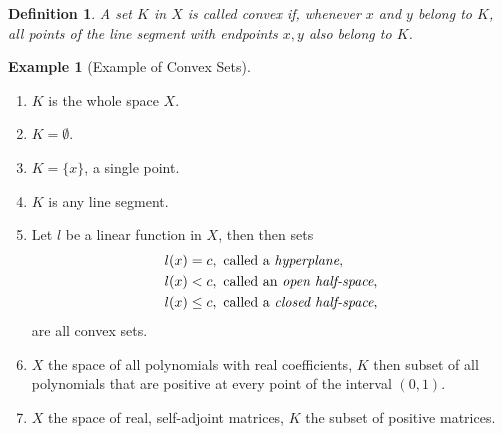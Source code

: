 \documentclass[10pt]{book}
\newtheorem{definition}{Definition}[chapter]
\theoremstyle{definition}
\newtheorem{example}{Example}[chapter]
\numberwithin{equation}{chapter}
\begin{document}
\medskip

\begin{definition}
A set $K$ in $X$ is called convex if, whenever $x$ and $y$ belong to $K$, all points of the line segment with endpoints $x, y$ also belong to $K$.
\end{definition}

\medskip

\begin{example}[Example of Convex Sets]
~\begin{enumerate}[label=(\arabic*)]
    \item $K$ is the whole space $X$.
    
    \item $K = \emptyset$.
    
    \item $K = \{x\}$, a single point.
    
    \item $K$ is any line segment.
    
    \item Let $l$ be a linear function in $X$, then then sets 
    \begin{align*}
        l(x) & = c, \,\,\text{called a {\em hyperplane}}, \\
        l(x) & < c, \,\,\text{called an {\em open half-space}}, \\
        l(x) & \leq c, \,\,\text{called a {\em closed half-space}},
    \end{align*}
    are all convex sets.
    
    \item $X$ the space of all polynomials with real coefficients, $K$ then subset of all polynomials that are positive at every point of the interval $(0,1)$.
    
    \item $X$ the space of real, self-adjoint matrices, $K$ the subset of positive matrices.
\end{enumerate}
\end{example}

\medskip
\end{document}
